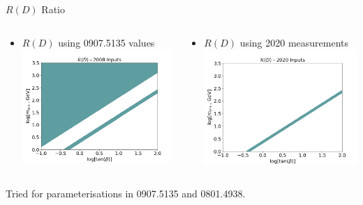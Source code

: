 \documentclass[10pt,xcolor={table,dvipsnames},t]{beamer}
\begin{document}
\begin{frame}{$R(D)$ Ratio}
    \begin{columns}[c]
        \begin{column}{0.45\textwidth}
            \begin{itemize}
                \item $R(D)$ using 0907.5135 values
                    \includegraphics[scale=0.25]{../images/rd_08}
            \end{itemize}
        \end{column}
        \begin{column}{0.45\textwidth}
            \begin{itemize}
                \item $R(D)$ using 2020 measurements
                    \includegraphics[scale=0.25]{../images/rd}
            \end{itemize}
        \end{column}
    \end{columns}
    \vspace{1em}
     Tried for parameterisations in 0907.5135 and 0801.4938. 
\end{frame}
\end{document}
